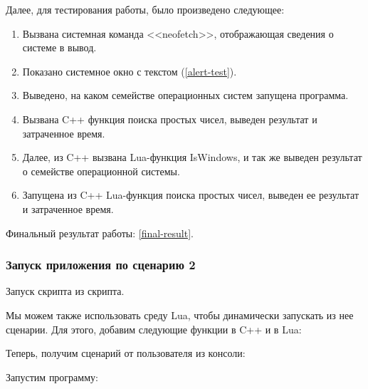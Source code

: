 Далее, для тестирования работы, было произведено следующее:
\begin{enumerate}
	\item Вызвана системная команда <<neofetch>>, отображающая сведения о системе в вывод.
	\item Показано системное окно с текстом (\autoref{alert-test}).
	\item Выведено, на каком семействе операционных систем запущена программа.
	\item Вызвана C++ функция поиска простых чисел, выведен результат и затраченное время.
	\item Далее, из C++ вызвана Lua-функция IsWindows, и так же выведен результат о семействе операционной системы.
	\item Запущена из C++ Lua-функция поиска простых чисел, выведен ее результат и затраченное время.
\end{enumerate}

Финальный результат работы: \autoref{final-result}.

\clearpage

\subsubsection{Запуск приложения по сценарию 2}
Запуск скрипта из скрипта.

Мы можем также использовать среду Lua, чтобы динамически запускать из нее сценарии. Для этого, добавим следующие функции в C++ и в Lua:

Теперь, получим сценарий от пользователя из консоли:

Запустим программу:


\clearpage